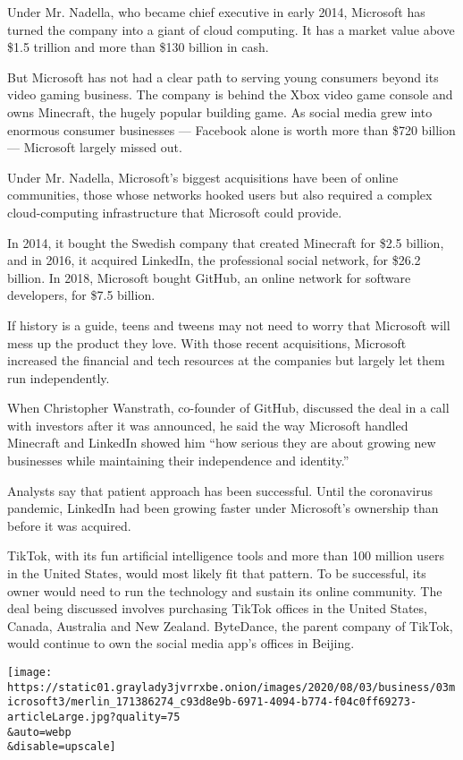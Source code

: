 Under Mr. Nadella, who became chief executive in early 2014, Microsoft
has turned the company into a giant of cloud computing. It has a market
value above \$1.5 trillion and more than \$130 billion in cash.

But Microsoft has not had a clear path to serving young consumers beyond
its video gaming business. The company is behind the Xbox video game
console and owns Minecraft, the hugely popular building game. As social
media grew into enormous consumer businesses --- Facebook alone is worth
more than \$720 billion --- Microsoft largely missed out.

Under Mr. Nadella, Microsoft's biggest acquisitions have been of online
communities, those whose networks hooked users but also required a
complex cloud-computing infrastructure that Microsoft could provide.

In 2014, it bought the Swedish company that created Minecraft for \$2.5
billion, and in 2016, it acquired LinkedIn, the professional social
network, for \$26.2 billion. In 2018, Microsoft bought GitHub, an online
network for software developers, for \$7.5 billion.

If history is a guide, teens and tweens may not need to worry that
Microsoft will mess up the product they love. With those recent
acquisitions, Microsoft increased the financial and tech resources at
the companies but largely let them run independently.

When Christopher Wanstrath, co-founder of GitHub, discussed the deal in
a call with investors after it was announced, he said the way Microsoft
handled Minecraft and LinkedIn showed him ``how serious they are about
growing new businesses while maintaining their independence and
identity.''

Analysts say that patient approach has been successful. Until the
coronavirus pandemic, LinkedIn had been growing faster under Microsoft's
ownership than before it was acquired.

TikTok, with its fun artificial intelligence tools and more than 100
million users in the United States, would most likely fit that pattern.
To be successful, its owner would need to run the technology and sustain
its online community. The deal being discussed involves purchasing
TikTok offices in the United States, Canada, Australia and New Zealand.
ByteDance, the parent company of TikTok, would continue to own the
social media app's offices in Beijing.

\texttt{[image: https://static01.graylady3jvrrxbe.onion/images/2020/08/03/business/03microsoft3/merlin\_171386274\_c93d8e9b-6971-4094-b774-f04c0ff69273-articleLarge.jpg?quality=75\\\&auto=webp\\\&disable=upscale]}

